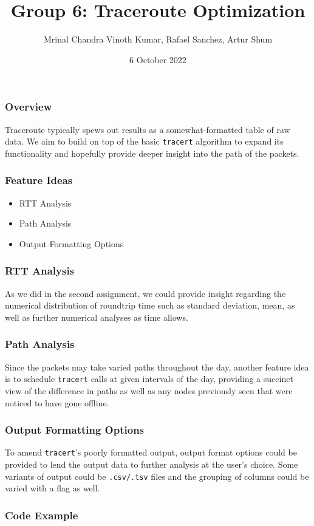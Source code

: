 \documentclass{beamer}
\title{Group 6: Traceroute Optimization}
\author{Mrinal Chandra Vinoth Kumar, Rafael Sanchez, Artur Shum}
\institute{Stevens Institute of Technology}
\date{6 October 2022}
\begin{document}
\frame{\titlepage}

\begin{frame}
\frametitle{Overview}

Traceroute typically spews out results as a somewhat-formatted table of
raw data. We aim to build on top of the basic \texttt{tracert} algorithm
to expand its functionality and hopefully provide deeper insight
into the path of the packets.

\end{frame}

\begin{frame}
\frametitle{Feature Ideas}
\begin{itemize}
  \item RTT Analysis
  \item Path Analysis
  \item Output Formatting Options
\end{itemize}
\end{frame}

\begin{frame}
\frametitle{RTT Analysis}

As we did in the second assignment, we could provide insight regarding
the numerical distribution of roundtrip time such as standard deviation,
mean, as well as further numerical analyses as time allows.

\end{frame}

\begin{frame}
\frametitle{Path Analysis}

Since the packets may take varied paths throughout the day, another feature
idea is to schedule \texttt{tracert} calls at given intervals of the day,
providing a succinct view of the difference in paths as well as any
nodes previously seen that were noticed to have gone offline.

\end{frame}

\begin{frame}

\frametitle{Output Formatting Options}

To amend \texttt{tracert}'s poorly formatted output, output format options 
could be provided to lend the output data to further analysis at the user's choice.
Some variants of output could be \texttt{.csv/.tsv} files and the 
grouping of columns could be varied with a flag as well.

\end{frame}

\begin{frame}
  \frametitle{Code Example}
\end{frame}
\end{document}
